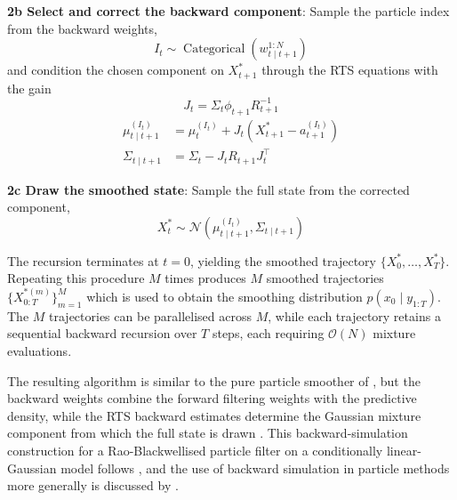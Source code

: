 \textbf{2b Select and correct the backward component}: Sample the particle index from the backward weights,
\begin{equation*}
    I_t \sim \operatorname{Categorical}(w_{t \mid t+1}^{1:N})
\end{equation*}
and condition the chosen component on $X_{t+1}^*$ through the RTS equations with the gain
\begin{equation*}
    J_t = \Sigma_t \phi_{t+1} R_{t+1}^{-1}
\end{equation*}
\begin{align*}
    \mu_{t \mid t+1}^{(I_t)} &= \mu_t^{(I_t)} + J_t \left( X_{t+1}^* - a_{t+1}^{(I_t)} \right) \\
    \Sigma_{t \mid t+1} &= \Sigma_t - J_t R_{t+1} J_t^\top
\end{align*}

\textbf{2c Draw the smoothed state}: Sample the full state from the corrected component,
\begin{equation*}
    X_t^* \sim \mathcal{N}\left( \mu_{t \mid t+1}^{(I_t)}, \Sigma_{t \mid t+1} \right)
\end{equation*}

The recursion terminates at $t = 0$, yielding the smoothed trajectory $\{X_0^*, \dots, X_T^*\}$. Repeating this procedure $M$ times produces $M$ smoothed trajectories $\{X_{0:T}^{*(m)}\}_{m=1}^M$ which is used to obtain the smoothing distribution $p(x_0 \mid y_{1:T})$. The $M$ trajectories can be parallelised across $M$, while each trajectory retains a sequential backward recursion over $T$ steps, each requiring $\mathcal{O}(N)$ mixture evaluations. 

The resulting algorithm is similar to the pure particle smoother of \citet{godsilldoucetwest2004montecarlosmoothing}, but the backward weights combine the forward filtering weights with the predictive density, while the RTS backward estimates determine the Gaussian mixture component from which the full state is drawn \citep{sarkkabunchgodsill2012rbpsmoother}. This backward-simulation construction for a Rao-Blackwellised particle filter on a conditionally linear-Gaussian model follows \citet{lindstenschonbunchgodsill2012rbpsmoother}, and the use of backward simulation in particle methods more generally is discussed by \citet{lindstenschon2011backwardsimulation}. 



